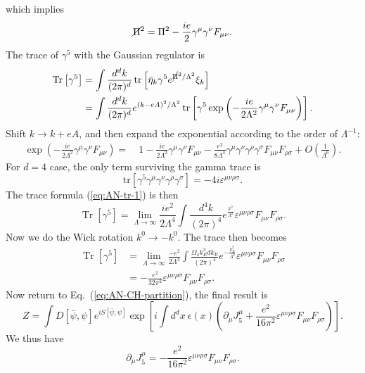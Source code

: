 \documentclass[aps,prb,superscriptaddress,nofootinbib]{revtex4}
\def \tr{\operatorname{tr}}
\def \Tr{\operatorname{Tr}}
\begin{document}
which implies
\begin{equation}
	\cancel{\Pi}^2 = \Pi^2 - \frac{ie}{2}\gamma^\mu \gamma^\nu F_{\mu\nu}.
\end{equation}
The trace of $\gamma^5$ with the Gaussian regulator is
\begin{equation}
\begin{aligned}
	\Tr\left[\gamma^5\right] 
	&= \int \frac{d^d k}{(2\pi)^d} \tr\left[\bar\eta_k \gamma^5 e^{\cancel{\Pi}^2/\Lambda^2}\xi_k \right] \\
	&= \int \frac{d^d k}{(2\pi)^d} e^{(k-eA)^2/\Lambda^2}\tr\left[\gamma^5 \exp\left(-\frac{ie}{2\Lambda^2} \gamma^\mu \gamma^\nu F_{\mu\nu}\right)\right].
\end{aligned}
\end{equation}
Shift $k \rightarrow k + e A$, and then expand the exponential according to the order of $\Lambda^{-1}$:
\begin{equation}
\begin{aligned}
	\exp\left(-\frac{ie}{2\Lambda^2} \gamma^\mu \gamma^\nu F_{\mu\nu}\right)
	=&\ 1-\frac{ie}{2\Lambda^2} \gamma^\mu \gamma^\nu F_{\mu\nu}-\frac{e^2}{8\Lambda^4} \gamma^\mu \gamma^\nu \gamma^\rho \gamma^\sigma F_{\mu\nu} F_{\rho\sigma} + O\left(\frac{1}{\Lambda^6}\right).
\end{aligned}
\end{equation}
For $d=4$ case, the only term surviving the gamma trace is
\begin{equation}
	\mathrm{tr} \left[\gamma^5 \gamma^\mu \gamma^\nu \gamma^\rho \gamma^\sigma \right] 
	= -4i\varepsilon^{\mu\nu\rho\sigma}.
\end{equation}
The trace formula (\ref{eq:AN-tr-1}) is then
\begin{equation}
	\Tr[\gamma^5] = \lim_{\Lambda\rightarrow\infty} \frac{ie^2}{2\Lambda^4} \int \frac{d^4k}{(2\pi)^4} e^{\frac{k^2}{\Lambda^2}}  \varepsilon^{\mu\nu\rho\sigma}F_{\mu\nu} F_{\rho\sigma}.
\end{equation}
Now we do the Wick rotation $k^0 \rightarrow -k^0$. 
The trace then becomes
\begin{equation}
\begin{aligned}
	\Tr[\gamma^5] &= \lim_{\Lambda\rightarrow\infty} \frac{-e^2}{2\Lambda^4} \int \frac{\Omega_4 k^3_E dk_E}{(2\pi)^4} e^{-\frac{k_E^2}{\Lambda^2}}  \varepsilon^{\mu\nu\rho\sigma}F_{\mu\nu} F_{\rho\sigma} \\
	&= -\frac{e^2}{32\pi^2} \varepsilon^{\mu\nu\rho\sigma}F_{\mu\nu} F_{\rho\sigma}.
\end{aligned}
\end{equation}
Now return to Eq.~(\ref{eq:AN-CH-partition}), the final result is
\begin{equation}
	Z = \int D[\bar\psi,\psi] e^{iS[\bar\psi,\psi]} \exp\left[i\int d^d x \ \epsilon(x) \left(\partial_\mu J_5^\mu+ \frac{e^2}{16\pi^2}\varepsilon^{\mu\nu\rho\sigma}F_{\mu\nu} F_{\rho\sigma}\right)\right].
\end{equation}
We thus have
\begin{equation}
	\partial_\mu J^\mu_5 = -\frac{e^2}{16\pi^2}\varepsilon^{\mu\nu\rho\sigma}F_{\mu\nu} F_{\rho\sigma}.
\end{equation}
\end{document}
